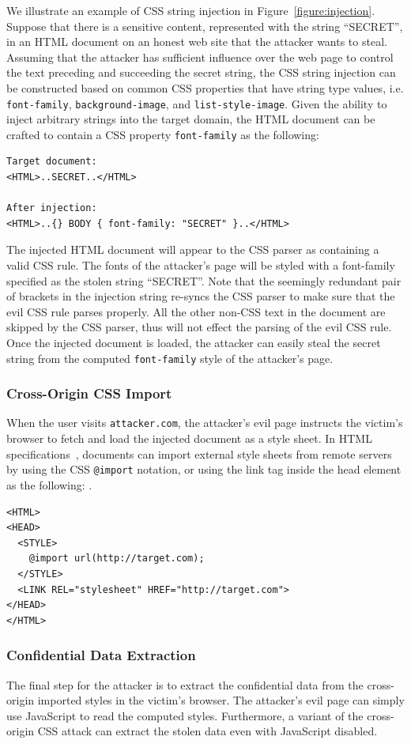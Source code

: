 \documentclass{acm_proc_article-sp}
\begin{document}
We illustrate an example of CSS string injection in Figure~\ref{figure:injection}. Suppose that there is a sensitive content, represented with the string ``SECRET'', in an HTML document on an honest web site that the attacker wants to steal. Assuming that the attacker has sufficient influence over the web page to control the text preceding and succeeding the secret string, the CSS string injection can be constructed based on common CSS properties that have string type values, i.e. \texttt{font-family}, \texttt{background-image}, and \texttt{list-style-image}. Given the ability to inject arbitrary strings into the target domain, the HTML document can be crafted to contain a CSS property \texttt{font-family} as the following:
\begin{verbatim}
Target document:
<HTML>..SECRET..</HTML>

After injection:
<HTML>..{} BODY { font-family: "SECRET" }..</HTML>
\end{verbatim}
The injected HTML document will appear to the CSS parser as containing a valid CSS rule. The fonts of the attacker's page will be styled with a font-family specified as the stolen string ``SECRET''. Note that the seemingly redundant pair of brackets in the injection string re-syncs the CSS parser to make sure that the evil CSS rule parses properly. All the other non-CSS text in the document are skipped by the CSS parser, thus will not effect the parsing of the evil CSS rule. Once the injected document is loaded, the attacker can easily steal the secret string from the computed \texttt{font-family} style of the attacker's page.

\subsubsection{Cross-Origin CSS Import}
When the user visits \texttt{attacker.com}, the attacker's evil page instructs the victim's browser to fetch and load the injected document as a style sheet. In HTML specifications~\cite{html}, documents can import external style sheets from remote servers by using the CSS \texttt{@import} notation, or using the link tag inside the head element as the following: .
\begin{verbatim}
<HTML>
<HEAD>
  <STYLE>
    @import url(http://target.com);
  </STYLE>
  <LINK REL="stylesheet" HREF="http://target.com">
</HEAD>
</HTML>
\end{verbatim}

\subsubsection{Confidential Data Extraction}
The final step for the attacker is to extract the confidential data from the cross-origin imported styles in the victim's browser. The attacker's evil page can simply use JavaScript to read the computed styles. Furthermore, a variant of the cross-origin CSS attack
can extract the stolen data even with JavaScript disabled.
\end{document}
